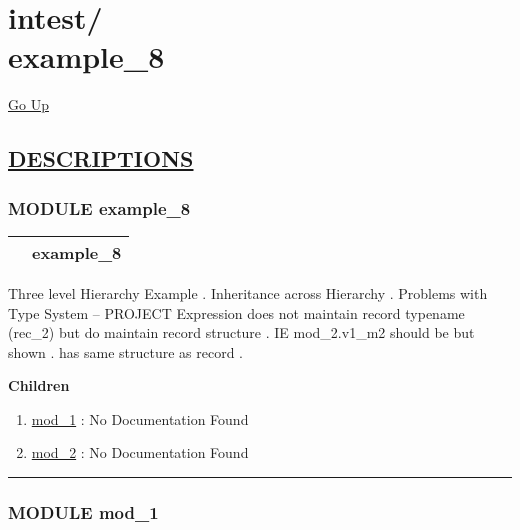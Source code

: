 \chapter*{\color{headfile}
{\large intest\slash\hspace{0pt}}
 \\
example_8
}
\hypertarget{ecldoc:toc:intest.example_8}{}
\hyperlink{ecldoc:toc:root/intest}{Go Up}


\section*{\underline{\textsf{DESCRIPTIONS}}}
\subsection*{\textsf{\colorbox{headtoc}{\color{white} MODULE}
example\_8}}

\hypertarget{ecldoc:intest.example_8}{}

{\renewcommand{\arraystretch}{1.5}
\begin{tabularx}{\textwidth}{|>{\raggedright\arraybackslash}l|X|}
\hline
\hspace{0pt}\mytexttt{\color{red} } & \textbf{example\_8} \\
\hline
\end{tabularx}
}

\par





Three level Hierarchy Example . Inheritance across Hierarchy . Problems with Type System -- PROJECT Expression does not maintain record typename (rec\_2) but do maintain record structure . IE mod\_2.v1\_m2 should be  but shown  .  has same structure as record  .







\textbf{Children}
\begin{enumerate}
\item \hyperlink{ecldoc:intest.example_8.mod_1}{mod\_1}
: No Documentation Found
\item \hyperlink{ecldoc:intest.example_8.mod_2}{mod\_2}
: No Documentation Found
\end{enumerate}

\rule{\linewidth}{0.5pt}

\subsection*{\textsf{\colorbox{headtoc}{\color{white} MODULE}
mod\_1}}

